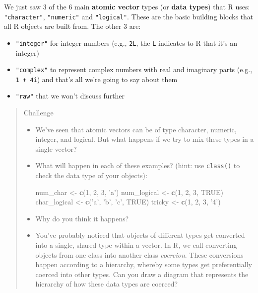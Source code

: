 \documentclass[]{book}
\newenvironment{Shaded}{\begin{snugshade}}{\end{snugshade}}
\newcommand{\KeywordTok}[1]{\textcolor[rgb]{0.13,0.29,0.53}{\textbf{#1}}}
\newcommand{\DecValTok}[1]{\textcolor[rgb]{0.00,0.00,0.81}{#1}}
\newcommand{\StringTok}[1]{\textcolor[rgb]{0.31,0.60,0.02}{#1}}
\newcommand{\OtherTok}[1]{\textcolor[rgb]{0.56,0.35,0.01}{#1}}
\newcommand{\NormalTok}[1]{#1}
\providecommand{\tightlist}{%
  \setlength{\itemsep}{0pt}\setlength{\parskip}{0pt}}
\theoremstyle{definition}
\theoremstyle{definition}
\theoremstyle{remark}
\begin{document}
We just saw 3 of the 6 main \textbf{atomic vector} types (or
\textbf{data types}) that R uses: \texttt{"character"},
\texttt{"numeric"} and \texttt{"logical"}. These are the basic building
blocks that all R objects are built from. The other 3 are:

\begin{itemize}
\tightlist
\item
  \texttt{"integer"} for integer numbers (e.g., \texttt{2L}, the
  \texttt{L} indicates to R that it's an integer)
\item
  \texttt{"complex"} to represent complex numbers with real and
  imaginary parts (e.g., \texttt{1\ +\ 4i}) and that's all we're going
  to say about them
\item
  \texttt{"raw"} that we won't discuss further
\end{itemize}

\begin{quote}
Challenge

\begin{itemize}
\item
  We've seen that atomic vectors can be of type character, numeric,
  integer, and logical. But what happens if we try to mix these types in
  a single vector? 
\item
  What will happen in each of these examples? (hint: use
  \texttt{class()} to check the data type of your objects):

\begin{Shaded}
\begin{Highlighting}[]
\NormalTok{num_char <-}\StringTok{ }\KeywordTok{c}\NormalTok{(}\DecValTok{1}\NormalTok{, }\DecValTok{2}\NormalTok{, }\DecValTok{3}\NormalTok{, }\StringTok{'a'}\NormalTok{)}
\NormalTok{num_logical <-}\StringTok{ }\KeywordTok{c}\NormalTok{(}\DecValTok{1}\NormalTok{, }\DecValTok{2}\NormalTok{, }\DecValTok{3}\NormalTok{, }\OtherTok{TRUE}\NormalTok{)}
\NormalTok{char_logical <-}\StringTok{ }\KeywordTok{c}\NormalTok{(}\StringTok{'a'}\NormalTok{, }\StringTok{'b'}\NormalTok{, }\StringTok{'c'}\NormalTok{, }\OtherTok{TRUE}\NormalTok{)}
\NormalTok{tricky <-}\StringTok{ }\KeywordTok{c}\NormalTok{(}\DecValTok{1}\NormalTok{, }\DecValTok{2}\NormalTok{, }\DecValTok{3}\NormalTok{, }\StringTok{'4'}\NormalTok{)}
\end{Highlighting}
\end{Shaded}
\item
  Why do you think it happens? 
\item
  You've probably noticed that objects of different types get converted
  into a single, shared type within a vector. In R, we call converting
  objects from one class into another class \emph{coercion}. These
  conversions happen according to a hierarchy, whereby some types get
  preferentially coerced into other types. Can you draw a diagram that
  represents the hierarchy of how these data types are coerced? 
\end{itemize}
\end{quote}
\end{document}
